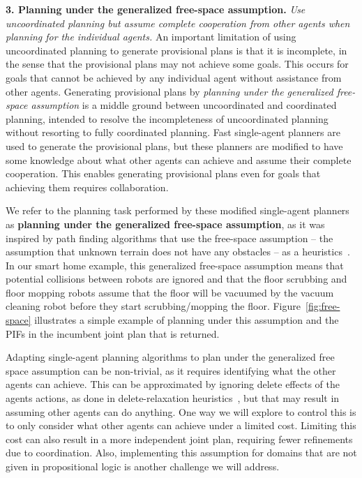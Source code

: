 \documentclass[11pt]{article}
\begin{document}
{\bf 3. Planning under the generalized free-space assumption.} {\em Use uncoordinated planning but assume complete cooperation from other agents when planning for the individual agents.} 
An important limitation of using uncoordinated planning to generate provisional plans is that it is incomplete, in the sense that the provisional plans may not achieve some goals. This occurs for goals that cannot be achieved by any individual agent without assistance from other agents. 
Generating provisional plans by {\em planning under the generalized free-space assumption} is a middle ground between uncoordinated and coordinated planning, intended to resolve the incompleteness of uncoordinated planning without resorting to fully coordinated planning. Fast single-agent planners are used to generate the provisional plans, but these planners are modified to have some knowledge about what  other agents can achieve and assume their complete cooperation. This enables generating provisional plans even for goals that achieving them requires collaboration. 

We refer to the planning task performed by these modified single-agent planners as {\bf planning under the generalized free-space assumption}, as it was inspired by path finding algorithms that use the free-space assumption -- the assumption that unknown terrain does not have any obstacles -- as a heuristics~\cite{koenig2005fast}. In our smart home example, this generalized free-space assumption means that potential collisions between robots are ignored and that the floor scrubbing and floor mopping robots assume that the floor will be vacuumed by the vacuum cleaning robot before they start scrubbing/mopping the floor. Figure~\ref{fig:free-space} illustrates a simple example of planning under this assumption and the PIFs in the incumbent joint plan that is returned. 

Adapting single-agent planning algorithms to plan under the generalized free space assumption can be non-trivial, as it requires identifying what the other agents can achieve. This can be approximated by ignoring delete effects of the agents actions, as done in delete-relaxation heuristics~\cite{hoffmann2005ignoring,domshlak2015red,vstolba2014relaxation}, but that may result in assuming other agents can do anything. One way we will explore to control this is to only consider what other agents can achieve under a limited cost. Limiting this cost can also result in a more independent joint plan, requiring fewer refinements due to coordination. Also, implementing this assumption for domains that are not given in propositional logic is another challenge we will address.%
\end{document}
